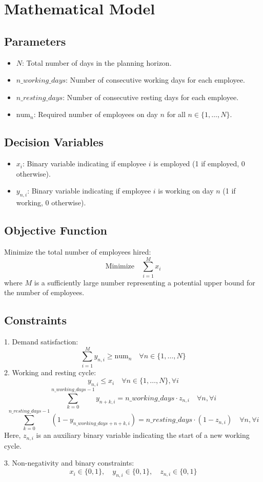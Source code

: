 \documentclass{article}
\begin{document}
\section*{Mathematical Model}

\subsection*{Parameters}
\begin{itemize}
    \item $N$: Total number of days in the planning horizon.
    \item $n\_working\_days$: Number of consecutive working days for each employee.
    \item $n\_resting\_days$: Number of consecutive resting days for each employee.
    \item $\text{num}_n$: Required number of employees on day $n$ for all $n \in \{1, \dots, N\}$.
\end{itemize}

\subsection*{Decision Variables}
\begin{itemize}
    \item $x_i$: Binary variable indicating if employee $i$ is employed (1 if employed, 0 otherwise).
    \item $y_{n, i}$: Binary variable indicating if employee $i$ is working on day $n$ (1 if working, 0 otherwise).
\end{itemize}

\subsection*{Objective Function}
Minimize the total number of employees hired:
\[
\text{Minimize} \quad \sum_{i=1}^{M} x_i
\]
where \( M \) is a sufficiently large number representing a potential upper bound for the number of employees.

\subsection*{Constraints}
1. Demand satisfaction:
   \[
   \sum_{i=1}^{M} y_{n, i} \geq \text{num}_n \quad \forall n \in \{1, \dots, N\}
   \]
2. Working and resting cycle:
   \[
   y_{n, i} \leq x_i \quad \forall n \in \{1, \dots, N\}, \forall i
   \]
   \[
   \sum_{k=0}^{n\_working\_days-1} y_{n+k, i} = n\_working\_days \cdot z_{n, i} \quad \forall n, \forall i
   \]
   \[
   \sum_{k=0}^{n\_resting\_days-1} (1-y_{n\_working\_days+n+k, i}) = n\_resting\_days \cdot (1-z_{n, i}) \quad \forall n, \forall i
   \]
   Here, $z_{n, i}$ is an auxiliary binary variable indicating the start of a new working cycle.

3. Non-negativity and binary constraints:
   \[
   x_i \in \{0, 1\}, \quad y_{n, i} \in \{0, 1\}, \quad z_{n, i} \in \{0, 1\}
   \]
\end{document}
